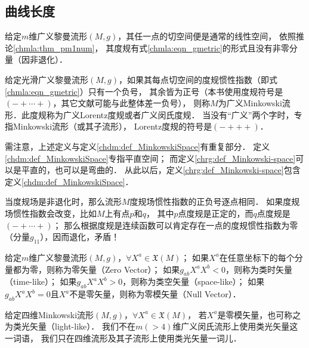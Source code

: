 \subsection{曲线长度}\label{chrg:sec_curve-length}

给定$m$维广义黎曼流形$(M,g)$，其任一点的切空间便是通常的线性空间，
依照推论\ref{chmla:thm_pm1num}，
其度规有式\eqref{chmla:eqn_gmetric}的形式且没有非零分量（因非退化）．

\begin{definition}\label{chrg:def_Minkowski-space}
    给定光滑广义黎曼流形$(M,g)$，如果其每点切空间的度规惯性指数（即式\eqref{chmla:eqn_gmetric}）只有一个负号，
    其余皆为正号（本书使用度规符号是$(-+\cdots+)$，其它文献可能与此整体差一负号），
    则称$M$为{\heiti 广义Minkowski流形}．此度规称为{\heiti 广义Lorentz度规}或者广义闵氏度规．
    当没有“广义”两个字时，专指Minkowski流形（或其子流形），
    Lorentz度规的符号是$(-+++)$．
\end{definition}

{\kaishu 需注意，上述定义与定义\ref{chdm:def_MinkowskiSpace}有重复部分．
定义\ref{chdm:def_MinkowskiSpace}专指平直空间；
而定义\ref{chrg:def_Minkowski-space}可以是平直的，也可以是弯曲的．
从此以后，定义\ref{chrg:def_Minkowski-space}包含定义\ref{chdm:def_MinkowskiSpace}．}

当度规场是非退化时，那么流形$M$度规场惯性指数的正负号逐点相同．
如果度规场惯性指数会改变，比如$M$上有点$p$和$q$，
其中$p$点度规是正定的，而$q$点度规是$(-+\cdots+)$；
那么根据度规是连续函数可以肯定存在一点的度规惯性指数为零（分量$g_{11}$），因而退化，矛盾！

\begin{definition}\label{chrg:def_vector-property}
    给定$m$维广义黎曼流形$(M,g)$，$\forall X^a \in \mathfrak{X}(M)$；
    如果$X^a$在任意坐标下的每个分量都为零，则称为{\heiti 零矢量}（Zero Vector）；
    如果$g_{ab}X^a X^b<0$，则称为{\heiti 类时矢量}（time-like）；
    如果$g_{ab}X^a X^b>0$，则称为{\heiti 类空矢量}（space-like）；
    如果$g_{ab}X^a X^b=0$且$X^a$不是零矢量，则称为{\heiti 零模矢量}（Null Vector）．
\end{definition}

\begin{definition}
    给定{\heiti 四维}Minkowski流形$(M,g)$，$\forall X^a \in \mathfrak{X}(M)$，
    若$X^a$是零模矢量，也可称之为{\heiti 类光矢量}（light-like）．
    我们不在$m(>4)$维广义闵氏流形上使用类光矢量这一词语，
    我们只在四维流形及其子流形上使用类光矢量一词儿．
\end{definition}


